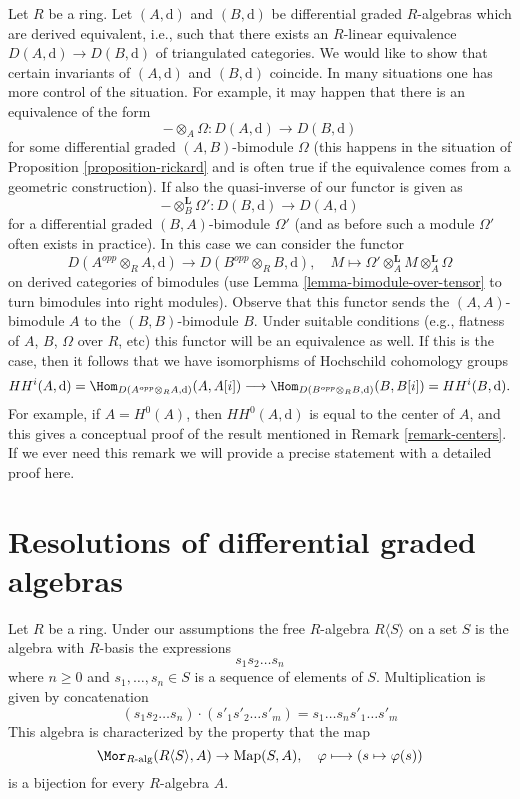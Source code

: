 \begin{remark}
\label{remark-hochschild-cohomology}
Let $R$ be a ring. Let $(A, \text{d})$ and $(B, \text{d})$ be differential
graded $R$-algebras which are derived equivalent, i.e., such that there
exists an $R$-linear equivalence $D(A, \text{d}) \to D(B, \text{d})$
of triangulated categories. We would like to show that certain invariants
of $(A, \text{d})$ and $(B, \text{d})$ coincide. In many situations
one has more control of the situation. For example, it may happen
that there is an equivalence of the form
$$
- \otimes_A \Omega : D(A, \text{d}) \longrightarrow D(B, \text{d})
$$
for some differential graded $(A, B)$-bimodule
$\Omega$ (this happens in the situation of
Proposition \ref{proposition-rickard} and is often true
if the equivalence comes from a geometric construction).
If also the quasi-inverse of our functor is given as
$$
- \otimes_B^\mathbf{L} \Omega' : D(B, \text{d}) \longrightarrow D(A, \text{d})
$$
for a differential graded $(B, A)$-bimodule $\Omega'$
(and as before such a module $\Omega'$ often exists in practice).
In this case we can consider the functor
$$
D(A^{opp} \otimes_R A, \text{d})
\longrightarrow
D(B^{opp} \otimes_R B, \text{d}),\quad
M \longmapsto \Omega' \otimes^\mathbf{L}_A M \otimes_A^\mathbf{L} \Omega
$$
on derived categories of bimodules (use
Lemma \ref{lemma-bimodule-over-tensor} to turn bimodules into
right modules).
Observe that this functor sends the $(A, A)$-bimodule $A$ to
the $(B, B)$-bimodule $B$. Under suitable conditions
(e.g., flatness of $A$, $B$, $\Omega$ over $R$, etc)
this functor will be an equivalence as well.
If this is the case, then it follows that we have isomorphisms
of Hochschild cohomology groups
$$
HH^i(A, \text{d}) =
\Hom_{D(A^{opp} \otimes_R A, \text{d})}(A, A[i])
\longrightarrow
\Hom_{D(B^{opp} \otimes_R B, \text{d})}(B, B[i]) =
HH^i(B, \text{d}).
$$
For example, if $A = H^0(A)$, then $HH^0(A, \text{d})$
is equal to the center of $A$, and this gives a conceptual proof
of the result mentioned in Remark \ref{remark-centers}.
If we ever need this remark we will provide a precise statement
with a detailed proof here.
\end{remark}



\section{Resolutions of differential graded algebras}
\label{section-resolution-dgas}

\noindent
Let $R$ be a ring. Under our assumptions the free $R$-algebra
$R\langle S \rangle$ on a set $S$ is the algebra with $R$-basis
the expressions
$$
s_1 s_2 \ldots s_n
$$
where $n \geq 0$ and $s_1, \ldots, s_n \in S$ is a sequence of
elements of $S$. Multiplication is given by concatenation
$$
(s_1 s_2 \ldots s_n) \cdot (s'_1 s'_2 \ldots s'_m) =
s_1 \ldots s_n s'_1 \ldots s'_m
$$
This algebra is characterized by the property that the map
$$
\Mor_{R\text{-alg}}(R\langle S \rangle, A) \to
\text{Map}(S, A),\quad
\varphi \longmapsto (s \mapsto \varphi(s))
$$
is a bijection for every $R$-algebra $A$.

